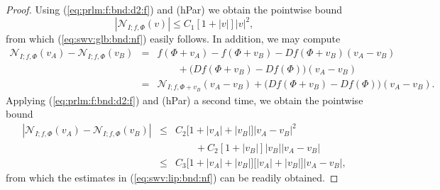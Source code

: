 \documentclass[10pt]{articleHJ}
\newcommand{\abs}[1]{\left\vert#1\right\vert}			%
\newcommand{\sref}[1]{(\ref{#1})}                       %
\numberwithin{equation}{section}
\begin{document}
\begin{proof}
Using \sref{eq:prlm:f:bnd:d2:f} and (hPar) we obtain the pointwise
bound
\begin{equation}
\abs{\mathcal{N}_{I;f,\Phi}(v) }
\le C_1  [1 + \abs{v} ] \abs{v}^2,
\end{equation}
from which \sref{eq:swv:glb:bnd:nf} easily follows.
In addition, we may compute
\begin{equation}
\begin{array}{lcl}
\mathcal{N}_{I;f,\Phi}(v_A)
 - \mathcal{N}_{I;f,\Phi}(v_B)
& = & f(\Phi + v_A) - f(\Phi + v_B) - Df(\Phi + v_B)(v_A - v_B)
\\[0.2cm]
& & \qquad
+ \big( Df(\Phi + v_B) - Df(\Phi) \big) (v_A - v_B)
\\[0.2cm]
& = & \mathcal{N}_{I;f, \Phi + v_B}(v_A - v_B)
  + \big(Df(\Phi + v_B) - Df(\Phi) \big) (v_A - v_B).
\end{array}
\end{equation}
Applying \sref{eq:prlm:f:bnd:d2:f} and (hPar)
a second time, we obtain the pointwise bound
\begin{equation}
\begin{array}{lcl}
\abs{\mathcal{N}_{I;f,\Phi}(v_A)
 - \mathcal{N}_{I;f,\Phi}(v_B)}
& \le & C_2 [1 + \abs{v_A} + \abs{v_B} \big]
              \abs{ v_A-v_B}^2
\\[0.2cm]
& & \qquad
  + C_2 [1 + \abs{v_B} ] \abs{v_B} \abs{v_A -v_B}
\\[0.2cm]
& \le &
  C_3 [1 + \abs{v_A} + \abs{v_B} \big]
      \big[ \abs{v_A} + \abs{v_B} \big]
              \abs{ v_A-v_B},
\end{array}
\end{equation}
from which the estimates in \sref{eq:swv:lip:bnd:nf}
can be readily obtained.
\end{proof}
\end{document}
